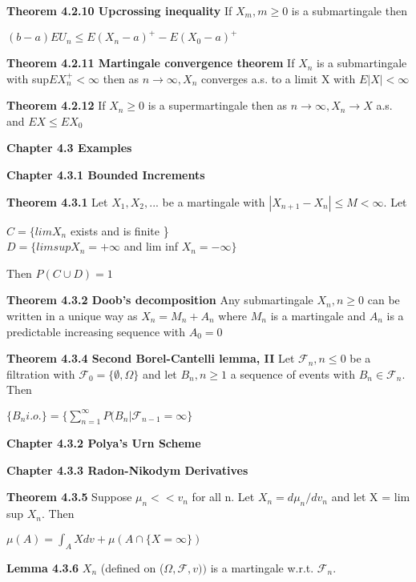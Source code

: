 \documentclass{article}
\begin{document}
\textbf {Theorem 4.2.10 Upcrossing inequality} If  $X_m, m \geq 0$ is a submartingale then
\begin{center}
$(b-a) EU_n \leq E(X_n - a)^+ - E(X_0 - a)^+$
\end{center}

\textbf {Theorem 4.2.11 Martingale convergence theorem} If $X_n$ is a submartingale with sup$EX_n^+ < \infty$ then as $n \to \infty, X_n$ converges a.s. to a limit X with $E|X| < \infty$

\textbf {Theorem 4.2.12} If $X_n \geq 0$ is a supermartingale then as $n \to \infty, X_n \to X$ a.s. and $EX \leq EX_0$

\textbf {Chapter 4.3 Examples}

\textbf {Chapter 4.3.1 Bounded Increments}

\textbf {Theorem 4.3.1} Let $X_1 , X_2 ,...$ be a martingale with $|X_{n+1} - X_n| \leq M < \infty$. Let
\begin{center}
$C = \{ lim X_n$ exists and is finite \} \\
$D = \{ lim sup X_n = +\infty$ and lim inf $X_n = -\infty \}$
\end{center}
Then $P(C \cup D ) = 1$

\textbf {Theorem 4.3.2 Doob's decomposition} Any submartingale $X_n , n \geq 0$ can be written in a unique way as $X_n = M_n + A_n$ where $M_n$ is a martingale and $A_n$ is a predictable increasing sequence with $A_0 = 0$

\textbf {Theorem 4.3.4 Second Borel-Cantelli lemma, II} Let $\mathcal{F}_n , n \leq 0$ be a filtration with $\mathcal{F}_0 = \{ \emptyset, \Omega \}$ and let $B_n, n \geq 1$ a sequence of events with $B_n \in \mathcal{F}_n$. Then
\begin{center}
$\{ B_n i.o. \} = \{ \sum_{n=1}^{\infty} P(B_n | \mathcal{F}_{n-1} = \infty \}$
\end{center}

\textbf {Chapter 4.3.2 Polya's Urn Scheme} 

\textbf {Chapter 4.3.3 Radon-Nikodym Derivatives}

\textbf {Theorem 4.3.5} Suppose $\mu_n << v_n$ for all n. Let $X_n = d \mu_n / dv_n$ and let X = lim sup $X_n$. Then
\begin{center}
$\mu (A) = \int_{A} Xdv + \mu(A \cap \{X = \infty \})$
\end{center}

\textbf {Lemma 4.3.6} $X_n$ (defined on ($\Omega, \mathcal{F}, v))$ is a martingale w.r.t. $\mathcal{F}_n$.
\end{document}
